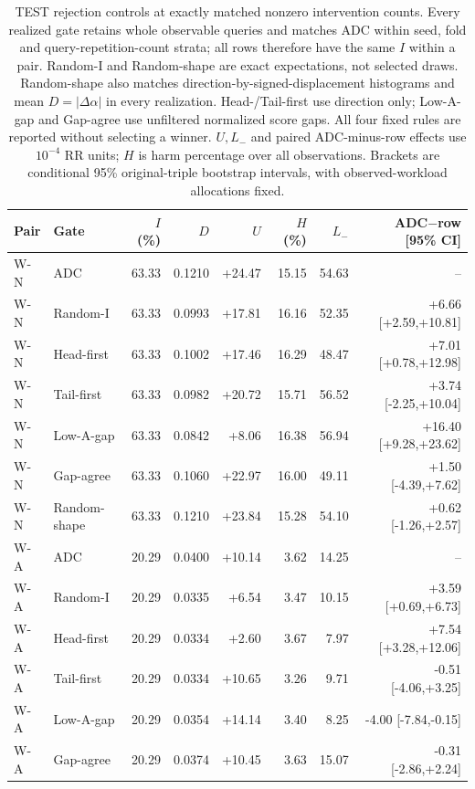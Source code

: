 \begin{table}[htbp]
\centering\footnotesize\setlength{\tabcolsep}{3pt}
\caption{TEST rejection controls at exactly matched nonzero intervention counts. Every realized gate retains whole observable queries and matches ADC within seed, fold and query-repetition-count strata; all rows therefore have the same $I$ within a pair. Random-I and Random-shape are exact expectations, not selected draws. Random-shape also matches direction-by-signed-displacement histograms and mean $D=|\Delta\alpha|$ in every realization. Head-/Tail-first use direction only; Low-A-gap and Gap-agree use unfiltered normalized score gaps. All four fixed rules are reported without selecting a winner. $U,L_-$ and paired ADC-minus-row effects use $10^{-4}$ RR units; $H$ is harm percentage over all observations. Brackets are conditional 95\% original-triple bootstrap intervals, with observed-workload allocations fixed.}
\label{tab:rejection-test}
\begin{tabular}{llrrrrrr}
\toprule
Pair & Gate & $I$ (\%) & $D$ & $U$ & $H$ (\%) & $L_-$ & ADC$-$row [95\% CI]\\
\midrule
W-N & ADC & 63.33 & 0.1210 & +24.47 & 15.15 & 54.63 & --\\
W-N & Random-I & 63.33 & 0.0993 & +17.81 & 16.16 & 52.35 & +6.66 [+2.59,+10.81]\\
W-N & Head-first & 63.33 & 0.1002 & +17.46 & 16.29 & 48.47 & +7.01 [+0.78,+12.98]\\
W-N & Tail-first & 63.33 & 0.0982 & +20.72 & 15.71 & 56.52 & +3.74 [-2.25,+10.04]\\
W-N & Low-A-gap & 63.33 & 0.0842 & +8.06 & 16.38 & 56.94 & +16.40 [+9.28,+23.62]\\
W-N & Gap-agree & 63.33 & 0.1060 & +22.97 & 16.00 & 49.11 & +1.50 [-4.39,+7.62]\\
W-N & Random-shape & 63.33 & 0.1210 & +23.84 & 15.28 & 54.10 & +0.62 [-1.26,+2.57]\\
W-A & ADC & 20.29 & 0.0400 & +10.14 & 3.62 & 14.25 & --\\
W-A & Random-I & 20.29 & 0.0335 & +6.54 & 3.47 & 10.15 & +3.59 [+0.69,+6.73]\\
W-A & Head-first & 20.29 & 0.0334 & +2.60 & 3.67 & 7.97 & +7.54 [+3.28,+12.06]\\
W-A & Tail-first & 20.29 & 0.0334 & +10.65 & 3.26 & 9.71 & -0.51 [-4.06,+3.25]\\
W-A & Low-A-gap & 20.29 & 0.0354 & +14.14 & 3.40 & 8.25 & -4.00 [-7.84,-0.15]\\
W-A & Gap-agree & 20.29 & 0.0374 & +10.45 & 3.63 & 15.07 & -0.31 [-2.86,+2.24]\\

\end{tabular}
\end{table}
